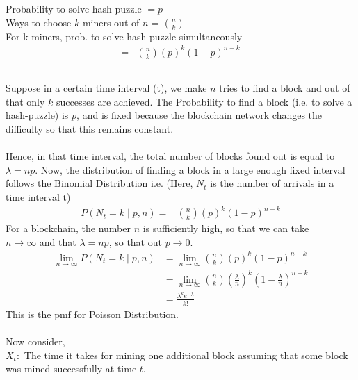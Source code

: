 \section{}
\setcounter{equation}{0}
\subsection{}
Probability to solve hash-puzzle  $ = p$ \\ 
Ways to choose $k$ miners out of $n$ = $ \binom{n}{k}$ \\
For k miners, prob. to solve hash-puzzle simultaneously 
\begin{align}
	=& \binom{n}{k} (p)^k (1-p)^{n-k}
\end{align}
\subsection{}
Suppose in a certain time interval (t), we make $n$ tries to find a block and out of that only $k$ successes are achieved. The Probability to find a block (i.e. to solve a hash-puzzle) is $p$, and is fixed because the blockchain network changes the difficulty so that this remains constant.
\\ \\
Hence, in that time interval, the total number of blocks found out is equal to $\lambda = np$. Now, the distribution of finding a block in a large enough fixed interval follows the Binomial Distribution i.e. (Here, $N_t$ is the number of arrivals in a time interval t)
\begin{align}
	P(N_t = k \mid p, n) = & \binom{n}{k} (p)^k (1-p)^{n-k}
\end{align}
For a blockchain, the number $n$ is sufficiently high, so that we can take  \\
$n \to \infty$ and that $\lambda = np$, so that out $p \to 0$.
\begin{align}
	\lim_{n \to \infty} P(N_t = k \mid p, n) 
	&= \lim_{n \to \infty} \binom{n}{k} (p)^k (1-p)^{n-k} \\
	&= \lim_{n \to \infty} \binom{n}{k} \left(\frac{\lambda}{n}\right)^k 
		\left(1-\frac{\lambda}{n}\right)^{n-k} \\
	&= \frac{\lambda^k e^{-\lambda}}{k !}
\end{align}
This is the pmf for Poisson Distribution. \\ \\
Now consider, \\
	$X_t: $ The time it takes for mining one additional block assuming that some block was mined successfully at time $t$.
